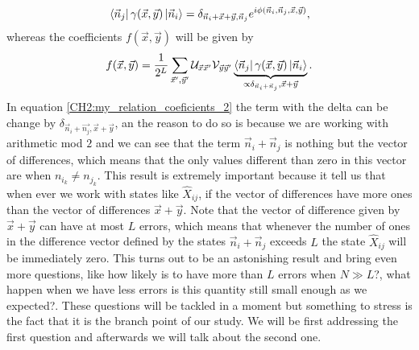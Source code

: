 \begin{equation}
\mathinner{\langle{\vec{n}_j}|}\gamma(\vec{x},\vec{y})\mathinner{|{\vec{n}_i}\rangle}=\delta_{\vec{n}_i+\vec{x}+\vec{y},\vec{n}_j}e^{i\phi(\vec{n}_i,\vec{n}_j,\vec{x},\vec{y})},
\label{CH2:my_relation_coeficients_2}
\end{equation}
whereas the coefficients $f(\vec{x},\vec{y})$ will be given by
\begin{equation}
f(\vec{x},\vec{y}) = \frac{1}{2^L}\sum_{\vec{x}',\vec{y}'} \mathcal{U}_{\vec{x}\vec{x}'} \mathcal{V}_{\vec{y}\vec{y}'} \underbrace{\mathinner{\langle{\vec{n}_j}|}\gamma(\vec{x},\vec{y})\mathinner{|{\vec{n}_i}\rangle}}_{\propto \delta_{\vec{n}_i+\vec{n}_j},\vec{x}+\vec{y}}.
\label{CH2:my_Relation_coeffitients_final}
\end{equation}
\indent In equation \eqref{CH2:my_relation_coeficients_2} the term with the delta can be change by $\delta_{\vec{n}_i+\vec{n_j},\vec{x}+\vec{y}}$, an the reason to do so is because we are working with arithmetic mod $2$ and we can see that the term $\vec{n}_i+\vec{n}_j$ is nothing but the vector of differences, which means that the only values different than zero in this vector are when $n_{i_k}\neq n_{j_k}$. This result is extremely important because it tell us that when ever we work with states like $\hat{X}_{ij}$, if the vector of differences have more ones than the vector of differences $\vec{x}+\vec{y}$. Note that the vector of difference given by $\vec{x}+\vec{y}$ can have at most $L$ errors, which means that whenever the number of ones in the difference vector defined by the states $\vec{n}_i+\vec{n}_j$ exceeds $L$ the state $\hat{X}_{ij}$ will be immediately zero. This turns out to be an astonishing result and bring even more questions, like how likely is to have more than $L$ errors when $N\gg L$?, what happen when we have less errors is this quantity still small enough as we expected?. These questions will be tackled in a moment but something to stress is the fact that it is the branch point of our study. We will be first addressing the first question and afterwards we will talk about the second one.
